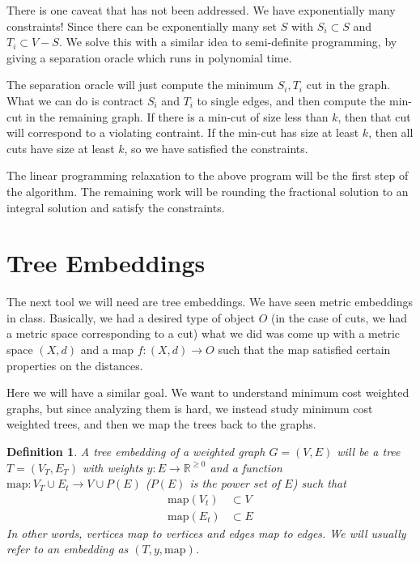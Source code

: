 \documentclass[12pt]{article}
\newtheorem{definition}{Definition}
\begin{document}
There is one caveat that has not been addressed. We have exponentially many constraints! Since there can be exponentially many set $S$ with $S_i \subset S$ and $T_i \subset V - S$. We solve this with a similar idea to semi-definite programming, by giving a separation oracle which runs in polynomial time. 

The separation oracle will just compute the minimum $S_i, T_i$ cut in the graph. What we can do is contract $S_i$ and $T_i$ to single edges, and then compute the min-cut in the remaining graph. If there is a min-cut of size less than $k$, then that cut will correspond to a violating contraint. If the min-cut has size at least $k$, then all cuts have size at least $k$, so we have satisfied the constraints.

The linear programming relaxation to the above program will be the first step of the algorithm. The remaining work will be rounding the fractional solution to an integral solution and satisfy the constraints. 

\section{Tree Embeddings}

The next tool we will need are tree embeddings. We have seen metric embeddings in class. Basically, we had a desired type of object $O$ (in the case of cuts, we had a metric space corresponding to a cut) what we did was come up with a metric space $(X, d)$ and a map $f: (X, d) \rightarrow O$ such that the map satisfied certain properties on the distances. 

Here we will have a similar goal. We want to understand minimum cost weighted graphs, but since analyzing them is hard, we instead study minimum cost weighted trees, and then we map the trees back to the graphs. 

\begin{definition}
A tree embedding of a weighted graph $G = (V, E)$ will be a tree $T = (V_T, E_T)$ with weights $y: E \rightarrow \mathbb{R}^{\geq 0}$ and a function $\text{map} : V_T \cup E_t \rightarrow V \cup P(E)$ ($P(E)$ is the power set of $E$) such that
\begin{align}
\text{map}(V_t) &\subset V \\
\text{map}(E_t) &\subset E
\end{align}
In other words, vertices map to vertices and edges map to edges. We will usually refer to an embedding as $(T, y, \text{map})$. 
\end{definition}
\end{document}
